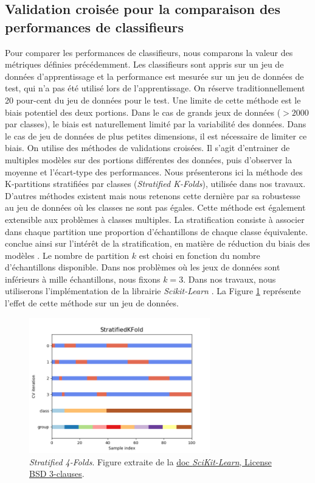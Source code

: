 \subsection{Validation croisée pour la comparaison des performances de classifieurs} \label{subsubsec:cross_val}
Pour comparer les performances de classifieurs, nous comparons la valeur des métriques définies précédemment.
Les classifieurs sont appris sur un jeu de données d'apprentissage et la performance est mesurée sur un jeu de données de test, qui n'a pas été utilisé lors de l'apprentissage.
On réserve traditionnellement 20 pour-cent du jeu de données pour le test.
Une limite de cette méthode est le biais potentiel des deux portions.
Dans le cas de grands jeux de données ($> 2 000$ par classes), le biais est naturellement limité par la variabilité des données.
Dans le cas de jeu de données de plus petites dimensions, il est nécessaire de limiter ce biais.
On utilise des méthodes de validations croisées.
Il s'agit d'entrainer de multiples modèles sur des portions différentes des données, puis d'observer la moyenne et l'écart-type des performances.
Nous présenterons ici la méthode des K-partitions stratifiées par classes (\textit{Stratified K-Folds}), utilisée dans nos travaux.
D'autres méthodes existent mais nous retenons cette dernière par sa robustesse au jeu de données où les classes ne sont pas égales.
Cette méthode est également extensible aux problèmes à classes multiples.
La stratification consiste à associer dans chaque partition une proportion d'échantillons de chaque classe équivalente.
\citeauthor{kohavi_study_1995} conclue ainsi sur l'intérêt de la stratification, en matière de réduction du biais des modèles \cite{kohavi_study_1995}.
Le nombre de partition $k$ est choisi en fonction du nombre d'échantillons disponible.
Dans nos problèmes où les jeux de données sont inférieurs à mille échantillons, nous fixons $k=3$.
Dans nos travaux, nous utiliserons l'implémentation de la librairie \textit{Scikit-Learn} \cite{pedregosa_scikit-learn_2011}.
La Figure \ref{fig:StratifiedKFold} représente l'effet de cette méthode sur un jeu de données.

\begin{figure}[hbtp]
	\centering
	\includegraphics[width=0.7\textwidth,height=0.7\textheight,keepaspectratio]{../Chap4/Figures/sphx_glr_plot_cv_indices_003.png}
	\caption{\emph{Stratified 4-Folds}. Figure extraite de la \href{https://scikit-learn.org/stable/auto_examples/model_selection/plot_cv_indices.html}{doc \textit{SciKit-Learn}, License BSD 3-clauses}.}
	\label{fig:StratifiedKFold}
\end{figure}

